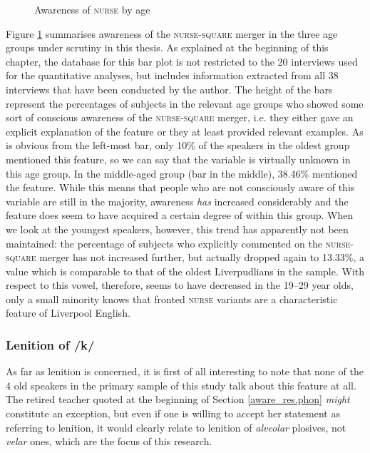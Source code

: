 \begin{figure}[h]
	\centering
		\resizebox{.49\linewidth}{!}{} 
	\caption{Awareness of \textsc{nurse} by age}
	\label{fig.aware.nurse}
\end{figure}

Figure \ref{fig.aware.nurse} summarises awareness of the \textsc{nurse}-\textsc{square} merger in the three age groups under scrutiny in this thesis.
As explained at the beginning of this chapter, the database for this bar plot is not restricted to the 20 interviews used for the quantitative analyses, but includes information extracted from all 38 interviews that have been conducted by the author.
The height of the bars represent the percentages of subjects in the relevant age groups who showed some sort of conscious awareness of the \textsc{nurse}-\textsc{square} merger, i.e. they either gave an explicit explanation of the feature or they at least provided relevant examples.
As is obvious from the left-most bar, only 10\% of the speakers in the oldest group mentioned this feature, so we can say that the variable is virtually unknown in this age group.
In the middle-aged group (bar in the middle), 38.46\% mentioned the feature.
While this means that people who are not consciously aware of this variable are still in the majority, awareness \emph{has} increased considerably and the feature does seem to have acquired a certain degree of  within this group.
When we look at the youngest speakers, however, this trend has apparently not been maintained: the percentage of subjects who explicitly commented on the \textsc{nurse}-\textsc{square} merger has not increased further, but actually dropped again to 13.33\%, a value which is comparable to that of the oldest Liverpudlians in the sample.
With respect to this vowel, therefore,  seems to have decreased in the 19--29 year olds, only a small minority knows that fronted \textsc{nurse} variants are a characteristic feature of Liverpool English.

\subsubsection{Lenition of /k/}
\label{aware_res.phon.k}

As far as lenition is concerned, it is first of all interesting to note that none of the 4 old speakers in the primary sample of this study talk about this feature at all.
The retired teacher quoted at the beginning of Section \ref{aware_res.phon} \emph{might} constitute an exception, but even if one is willing to accept her statement as referring to lenition, it would clearly relate to lenition of \emph{alveolar} plosives, not \emph{velar} ones, which are the focus of this research.

